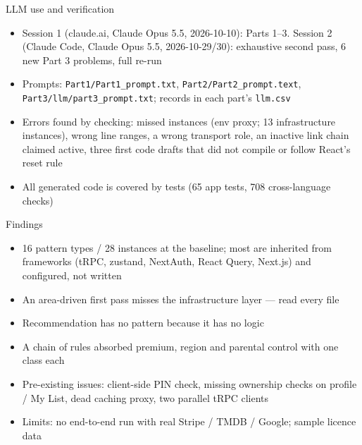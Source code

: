 \documentclass[aspectratio=169,10pt]{beamer}
\begin{document}
\begin{frame}{LLM use and verification}
\small
\begin{itemize}
\item Session 1 (claude.ai, Claude Opus 5.5, 2026-10-10): Parts 1--3. Session 2 (Claude Code, Claude Opus 5.5, 2026-10-29/30): exhaustive second pass, 6 new Part 3 problems, full re-run
\item Prompts: \texttt{Part1/Part1\_prompt.txt}, \texttt{Part2/Part2\_prompt.text}, \texttt{Part3/llm/part3\_prompt.txt}; records in each part's \texttt{llm.csv}
\item Errors found by checking: missed instances (env proxy; 13 infrastructure instances), wrong line ranges, a wrong transport role, an inactive link chain claimed active, three first code drafts that did not compile or follow React's reset rule
\item All generated code is covered by tests (65 app tests, 708 cross-language checks)
\end{itemize}
\end{frame}

\begin{frame}{Findings}
\small
\begin{itemize}
\item 16 pattern types / 28 instances at the baseline; most are inherited from frameworks (tRPC, zustand, NextAuth, React Query, Next.js) and configured, not written
\item An area-driven first pass misses the infrastructure layer --- read every file
\item Recommendation has no pattern because it has no logic
\item A chain of rules absorbed premium, region and parental control with one class each
\item Pre-existing issues: client-side PIN check, missing ownership checks on profile / My List, dead caching proxy, two parallel tRPC clients
\item Limits: no end-to-end run with real Stripe / TMDB / Google; sample licence data
\end{itemize}
\end{frame}
\end{document}
